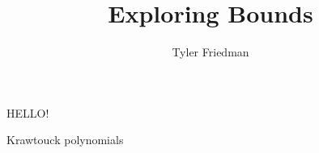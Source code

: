 \documentclass{article}
\title{Exploring Bounds}
\author{Tyler Friedman}
\begin{document}
\maketitle

HELLO!

Krawtouck polynomials
\end{document}

